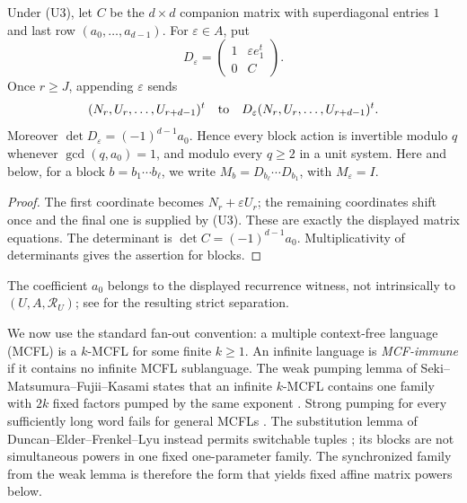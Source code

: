 \begin{lemma}
  \label{lem:affine-recurrence-block-action}
  Under \textup{(U3)}, let \(C\) be the \(d\times d\) companion matrix
  with superdiagonal entries \(1\) and last row
  \((a_0,\ldots,a_{d-1})\). For \(\varepsilon\in A\), put
  \[
    D_\varepsilon=
    \begin{pmatrix}
      1&\varepsilon e_1^t\\
      0&C
    \end{pmatrix}.
  \]
  Once \(r\ge J\), appending \(\varepsilon\) sends
  \[
    (N_r,U_r,\ldots,U_{r+d-1})^t
    \quad\hbox{to}\quad
    D_\varepsilon(N_r,U_r,\ldots,U_{r+d-1})^t.
  \]
  Moreover
  \(\det D_\varepsilon=(-1)^{d-1}a_0\). Hence every block action is
  invertible modulo \(q\) whenever \(\gcd(q,a_0)=1\), and modulo every
  \(q\ge2\) in a unit system. Here and below, for a block
  \(b=b_1\cdots b_\ell\), we write
  \(M_b=D_{b_\ell}\cdots D_{b_1}\), with \(M_\varepsilon=I\).
\end{lemma}

\begin{proof}
  The first coordinate becomes \(N_r+\varepsilon U_r\); the remaining
  coordinates shift once and the final one is supplied by \textup{(U3)}.
  These are exactly the displayed matrix equations. The determinant
  is \(\det C=(-1)^{d-1}a_0\). Multiplicativity of determinants gives
  the assertion for blocks.
\end{proof}

The coefficient \(a_0\) belongs to the displayed recurrence witness,
not intrinsically to \((U,A,\mathcal R_U)\); see
 for the resulting strict
separation.

We now use the standard fan-out convention: a multiple context-free
language (MCFL) is a \(k\)-MCFL for some finite \(k\ge1\). An infinite
language is \emph{MCF-immune} if it contains no infinite MCFL
sublanguage. The weak pumping lemma of Seki--Matsumura--Fujii--Kasami
states that an infinite \(k\)-MCFL contains one family with \(2k\) fixed
factors pumped by the same exponent \cite[Lemma~3.2]{SekiEtAl1991}.
Strong pumping for every sufficiently long word fails for general MCFLs
\cite{KanazawaKobeleMichaelisSalvatiYoshinaka2014}. The substitution lemma
of Duncan--Elder--Frenkel--Lyu instead permits switchable tuples
\cite[Theorem~4.5]{DuncanElderFrenkelLiu2026}; its blocks are not
simultaneous powers in one fixed one-parameter family. The synchronized
family from the weak lemma is therefore the form that yields fixed affine
matrix powers below.

